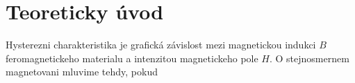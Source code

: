 \documentclass[10pt,a4paper]{report}
\begin{document}
\setcounter{page}{1}


\section{Teoreticky úvod}
Hysterezni charakteristika je grafická závislost mezi magnetickou indukci $B$ feromagnetickeho materialu a intenzitou magnetickeho pole $H$. O stejnosmernem magnetovani mluvime tehdy, pokud 
\label{end}
\end{document}
